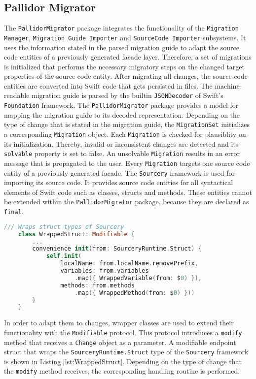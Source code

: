 \subsection{Pallidor Migrator}\label{subsec:PallidorMigrator}

The \texttt{PallidorMigrator} package integrates the functionality of the \texttt{Migration} \texttt{Ma\-nager}, \texttt{Migration Guide Importer} and \texttt{SourceCode Importer} subsystems. It uses the information stated in the parsed migration guide to adapt the source code entities of a previously generated facade layer. Therefore, a set of migrations is initialized that performs the necessary migratory steps on the changed target properties of the source code entity. After migrating all changes, the source code entities are converted into Swift code that gets persisted in files. The machine-readable migration guide is parsed by the builtin \texttt{JSONDecoder} of Swift's \texttt{Foundation} framework. The \texttt{PallidorMigrator} package provides a model for mapping the migration guide to its decoded representation. Depending on the type of change that is stated in the migration guide, the \texttt{MigrationSet} initializes a corresponding \texttt{Migration} object. Each \texttt{Migration} is checked for plausiblity on its initialization. Thereby, invalid or inconsistent changes are detected and its \texttt{solvable} property is set to false. An unsolvable \texttt{Migration} results in an error message that is propagated to the user. Every \texttt{Migration} targets one source code entity of a previously generated facade. The \texttt{Sourcery} framework is used for importing its source code. It provides source code entities for all syntactical elements of Swift code such as classes, structs and methods. These entities cannot be extended within the \texttt{PallidorMigrator} package, because they are declared as \texttt{final}.

\begin{lstlisting}[language=Swift, caption={Extending a wrapped Sourcery struct}, captionpos=b, label={lst:WrappedStruct}]
	/// Wraps struct types of Sourcery
	class WrappedStruct: Modifiable {
		...
		convenience init(from: SourceryRuntime.Struct) {
			self.init(
				localName: from.localName.removePrefix, 
				variables: from.variables
					.map({ WrappedVariable(from: $0) }), 
				methods: from.methods
					.map({ WrappedMethod(from: $0) }))
		}
	}
\end{lstlisting}

In order to adapt them to changes, wrapper classes are used to extend their functionality with the \texttt{Modifiable} protocol. This protocol introduces a \texttt{modify} method that receives a \texttt{Change} object as a parameter. A modifiable endpoint struct that wraps the \texttt{SourceryRuntime.\-Struct} type of the \texttt{Sourcery} framework is shown in Listing \ref{lst:WrappedStruct}. Depending on the type of change that the \texttt{modify} method receives, the corresponding handling routine is performed. 

